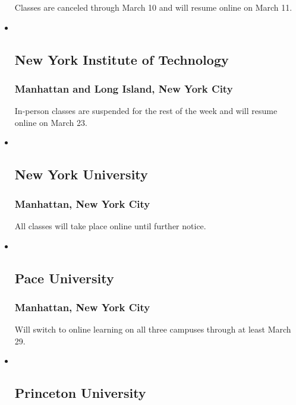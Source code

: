 \begin{itemize}
  Classes are canceled through March 10 and will resume online on March
  11.
\item ~
  \hypertarget{new-york-institute-of-technology}{%
  \subsection{New York Institute of
  Technology}\label{new-york-institute-of-technology}}

  \hypertarget{manhattan-and-long-island-new-york-city}{%
  \subsubsection{Manhattan and Long Island, New York
  City}\label{manhattan-and-long-island-new-york-city}}

  In-person classes are suspended for the rest of the week and will
  resume online on March 23.
\item ~
  \hypertarget{new-york-university}{%
  \subsection{New York University}\label{new-york-university}}

  \hypertarget{manhattan-new-york-city-7}{%
  \subsubsection{Manhattan, New York
  City}\label{manhattan-new-york-city-7}}

  All classes will take place online until further notice.
\item ~
  \hypertarget{pace-university}{%
  \subsection{Pace University}\label{pace-university}}

  \hypertarget{manhattan-new-york-city-8}{%
  \subsubsection{Manhattan, New York
  City}\label{manhattan-new-york-city-8}}

  Will switch to online learning on all three campuses through at least
  March 29.
\item ~
  \hypertarget{princeton-university}{%
  \subsection{Princeton University}\label{princeton-university}}


\end{itemize}
